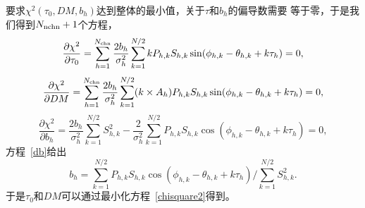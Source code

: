 要求$\chi^2(\tau_{0},DM,b_h)$达到整体的最小值，关于$\tau$和$b_h$的偏导数需要
等于零，于是我们得到$N_{\rm{nchn}}+1$个方程，
%
\begin{equation}
\label{dtau}
\frac{\partial\chi^2}{\partial\tau_{0}}=\sum_{h=1}^{N_{\rm{chn}}}\frac{2b_h}{\sigma_{h}^2}\sum_{k=1}^{N/2}kP_{h,k}S_{h,k}\sin(\phi_{h,k}-\theta_{h,k}+k\tau_{h})=0,
\end{equation}
%
\begin{equation}
\label{ddm}
\frac{\partial\chi^2}{\partial DM}=\sum_{h=1}^{N_{\rm{chn}}}\frac{2b_h}{\sigma_{h}^2}\sum_{k=1}^{N/2}(k\times A_{h})P_{h,k}S_{h,k}\sin(\phi_{h,k}-\theta_{h,k}+k\tau_{h})=0,
\end{equation}
%
\begin{equation}
\label{db}
\frac{\partial\chi^2}{\partial b_h}=\frac{2b_h}{\sigma_{h}^2}\sum_{k=1}^{N/2}S_{h,k}^2-\frac{2}{\sigma_{h}^2}\sum_{k=1}^{N/2}P_{h,k}S_{h,k}\cos(\phi_{h,k}-\theta_{h,k}+k\tau_{h})=0,
\end{equation}
%
方程~\ref{db}给出
%
\begin{equation}
\label{bh}
b_h=\sum_{k=1}^{N/2}P_{h,k}S_{h,k}\cos(\phi_{h,k}-\theta_{h,k}+k\tau_{h})/\sum_{k=1}^{N/2}S_{h,k}^2.
\end{equation}
%
于是$\tau_{0}$和$DM$可以通过最小化方程~\ref{chisquare2}得到。

